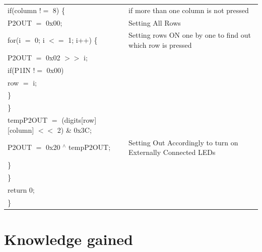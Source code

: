 \documentclass[12pt, letterpaper]{article}
\begin{document}
\begin{longtable}{|p{8cm}||p{6cm}|}
            \hspace{0.3cm}    if(column $!=$ 8) \{  & if more than one column is not pressed \\
            \hspace{0.5cm}     P2OUT $=$ 0x00; & Setting All Rows \\
            \hspace{0.5cm}    for(i $=$ 0; i $<=$ 1; i++) \{ & Setting rows ON one by one to find out which row is pressed\\
            \hspace{0.7cm}    P2OUT $=$ 0x02 $>>$ i; & \\
            \hspace{0.7cm}    if(P1IN $!=$ 0x00) & \\
            \hspace{0.9cm}    row $=$ i;     &  \\
            \hspace{0.7cm}    \} & \\
            \hspace{0.5cm}    \} & \\
            \hspace{0.3cm}    tempP2OUT $=$ (digits[row][column] $<<$ 2) \& 0x3C; & \\
            \hspace{0.3cm}    P2OUT $=$ 0x20 $^\wedge$ tempP2OUT; &  Setting Out Accordingly to turn on Externally Connected LEDs\\
            \hspace{0.3cm}    \} & \\

            \hspace{0.1cm}    \} & \\
            \hspace{0.1cm}     return 0; & \\
            \} & \\

\end{longtable}

\section{Knowledge gained}
\end{document}
